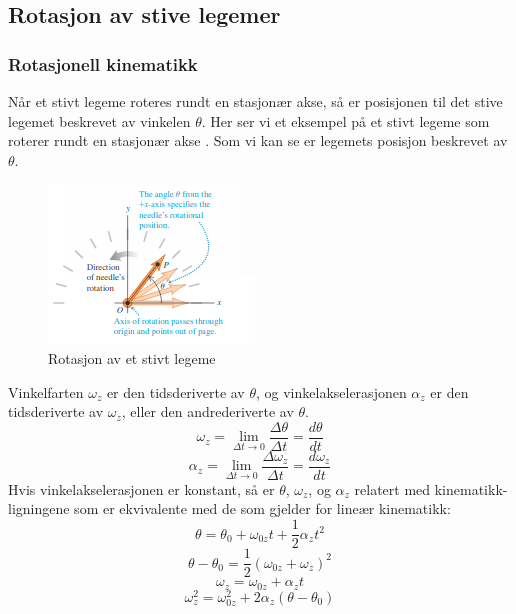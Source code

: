 \graphicspath{ {./bilder/} }

\subsection{Rotasjon av stive legemer}

\subsubsection{Rotasjonell kinematikk}
Når et stivt legeme roteres rundt en stasjonær akse, så er posisjonen til det stive legemet beskrevet av vinkelen $\theta.$\newline\newline
Her ser vi et eksempel på et stivt legeme som roterer rundt en stasjonær akse \cite{FYSIKK:1}. Som vi kan se er legemets posisjon beskrevet av $\theta.$
\begin{figure}[!ht]
\begin{center}
\includegraphics{rapport/teori/bilder/theta.png}
\caption{Rotasjon av et stivt legeme}
\label{fig:rotasjon}
\end{center}
\end{figure}\newline\newline
Vinkelfarten $\omega_z$ er den tidsderiverte av $\theta$, og vinkelakselerasjonen $\alpha_z$ er den tidsderiverte av $\omega_z$, eller den andrederiverte av $\theta.$
\begin{equation}
\label{eqn:first}
    \omega_z=\lim_{\Delta t\rightarrow0}{\frac{\Delta\theta}{\Delta t}}=\frac{d\theta}{dt}
\end{equation}
\begin{equation}
    \alpha_z=\lim_{\Delta t\rightarrow0}{\frac{\Delta\omega_z}{\Delta t}}=\frac{d\omega_z}{dt}
\end{equation}
Hvis vinkelakselerasjonen er konstant, så er $\theta$, $\omega_z$, og $\alpha_z$ relatert med kinematikk-ligningene som er ekvivalente med de som gjelder for lineær kinematikk:
\begin{equation}
    \theta=\theta_0+\omega_{0z}t+\frac{1}{2}\alpha_zt^2
\end{equation}
\begin{equation}
    \theta-\theta_0=\frac{1}{2}\left(\omega_{0z}+\omega_z\right)^2
\end{equation}
\begin{equation}
    \omega_z=\omega_{0z}+\alpha_zt
\end{equation}
\begin{equation}
    \omega_z^2=\omega_{0z}^2+2\alpha_z(\theta-\theta_0)
\end{equation}

